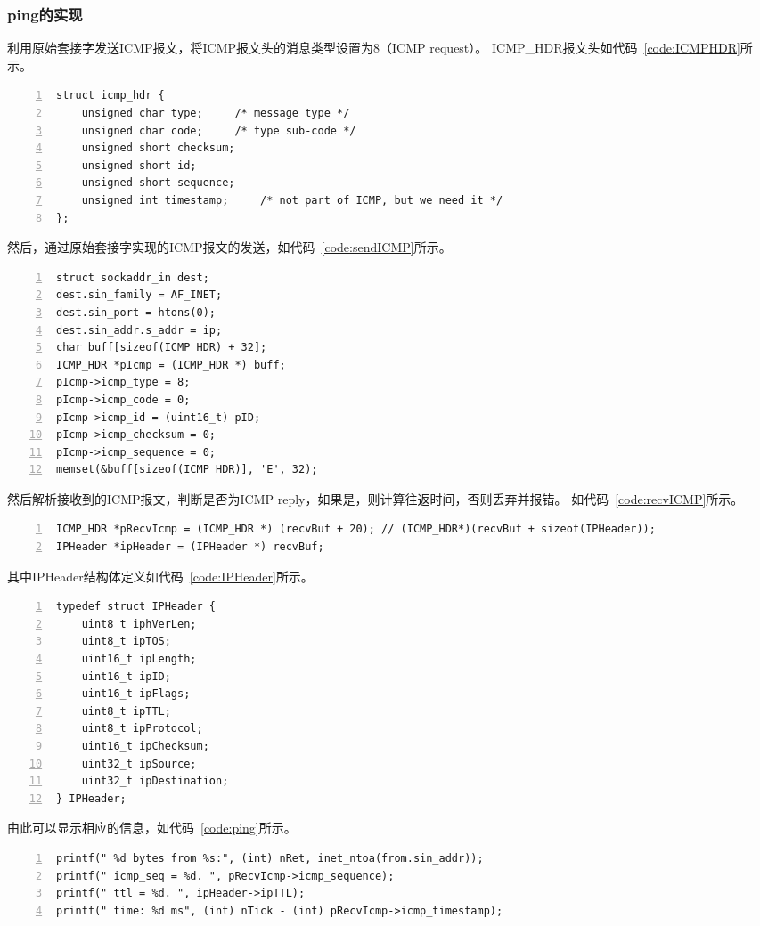 \documentclass[a4paper,twoside]{ctexrep}
\begin{document}
\begin{spacing}{1.2}
\subsubsection{ping的实现}

利用原始套接字发送ICMP报文，将ICMP报文头的消息类型设置为8（ICMP request）。
ICMP\_HDR报文头如代码~\ref{code:ICMPHDR}所示。

\begin{lstlisting}[numbers=left,style=CppStyle,caption={ICMP\_HDR结构体定义},label={code:ICMPHDR}]
struct icmp_hdr {
	unsigned char type;		/* message type */
	unsigned char code;		/* type sub-code */
	unsigned short checksum;
	unsigned short id;
	unsigned short sequence;
	unsigned int timestamp;		/* not part of ICMP, but we need it */
};
\end{lstlisting}

然后，通过原始套接字实现的ICMP报文的发送，如代码~\ref{code:sendICMP}所示。

\begin{lstlisting}[numbers=left,style=CppStyle,caption={ICMP报文发送函数},label={code:sendICMP}]
struct sockaddr_in dest;
dest.sin_family = AF_INET;
dest.sin_port = htons(0);
dest.sin_addr.s_addr = ip;
char buff[sizeof(ICMP_HDR) + 32];
ICMP_HDR *pIcmp = (ICMP_HDR *) buff;
pIcmp->icmp_type = 8; 
pIcmp->icmp_code = 0;
pIcmp->icmp_id = (uint16_t) pID;
pIcmp->icmp_checksum = 0;
pIcmp->icmp_sequence = 0;
memset(&buff[sizeof(ICMP_HDR)], 'E', 32);
\end{lstlisting}

然后解析接收到的ICMP报文，判断是否为ICMP reply，如果是，则计算往返时间，否则丢弃并报错。
如代码~\ref{code:recvICMP}所示。
\begin{lstlisting}[numbers=left,style=CppStyle,caption={ICMP报文接收函数},label={code:recvICMP}]
ICMP_HDR *pRecvIcmp = (ICMP_HDR *) (recvBuf + 20); // (ICMP_HDR*)(recvBuf + sizeof(IPHeader));
IPHeader *ipHeader = (IPHeader *) recvBuf;
\end{lstlisting}
其中IPHeader结构体定义如代码~\ref{code:IPHeader}所示。
\begin{lstlisting}[numbers=left,style=CppStyle,caption={IPHeader结构体定义},label={code:IPHeader}]
	typedef struct IPHeader {
    uint8_t iphVerLen; 
    uint8_t ipTOS; 
    uint16_t ipLength; 
    uint16_t ipID; 
    uint16_t ipFlags; 
    uint8_t ipTTL; 
    uint8_t ipProtocol;
    uint16_t ipChecksum;
    uint32_t ipSource; 
    uint32_t ipDestination; 
} IPHeader;
\end{lstlisting}
由此可以显示相应的信息，如代码~\ref{code:ping}所示。
\begin{lstlisting}[numbers=left,style=CppStyle,caption={ping显示信息},label={code:ping}]
printf(" %d bytes from %s:", (int) nRet, inet_ntoa(from.sin_addr));
printf(" icmp_seq = %d. ", pRecvIcmp->icmp_sequence);
printf(" ttl = %d. ", ipHeader->ipTTL);
printf(" time: %d ms", (int) nTick - (int) pRecvIcmp->icmp_timestamp);
\end{lstlisting}


\end{spacing}
\end{document}

